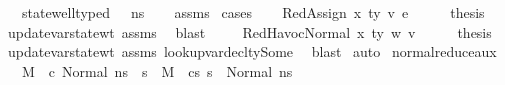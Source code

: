 \begin{isabellebody}
\ \ \ {\isachardoublequoteopen}state{\isacharunderscore}{\kern0pt}well{\isacharunderscore}{\kern0pt}typed\ {\isasymLambda}\ {\isasymOmega}\ ns{\isacharprime}{\kern0pt}{\isachardoublequoteclose}\isanewline
%
\isadelimproof
\ \ %
\endisadelimproof
%
\isatagproof
{}\isamarkupfalse%
\ assms\isanewline
{}\isamarkupfalse%
\ cases\isanewline
\ \ \isamarkupfalse%
\ {\isacharparenleft}{\kern0pt}RedAssign\ x\ ty\ v\ e{\isacharparenright}{\kern0pt}\isanewline
\ \ \isamarkupfalse%
\ \isamarkupfalse%
\ {\isacharquery}{\kern0pt}thesis\ \isamarkupfalse%
\ update{\isacharunderscore}{\kern0pt}var{\isacharunderscore}{\kern0pt}state{\isacharunderscore}{\kern0pt}wt\ assms\ \isamarkupfalse%
\ blast\ \isanewline
{}\isamarkupfalse%
\isanewline
\ \ \isamarkupfalse%
\ {\isacharparenleft}{\kern0pt}RedHavocNormal\ x\ ty\ w\ v{\isacharparenright}{\kern0pt}\isanewline
\ \ \isamarkupfalse%
\ \isamarkupfalse%
\ {\isacharquery}{\kern0pt}thesis\ \isamarkupfalse%
\ update{\isacharunderscore}{\kern0pt}var{\isacharunderscore}{\kern0pt}state{\isacharunderscore}{\kern0pt}wt\ assms\ lookup{\isacharunderscore}{\kern0pt}var{\isacharunderscore}{\kern0pt}decl{\isacharunderscore}{\kern0pt}ty{\isacharunderscore}{\kern0pt}Some\ \isamarkupfalse%
\ blast\isanewline
{}\isamarkupfalse%
\ auto%
\endisatagproof
{\isafoldproof}%
%
\isadelimproof
\isanewline
%
\endisadelimproof
\isanewline
{}\isamarkupfalse%
\ normal{\isacharunderscore}{\kern0pt}reduce{\isacharunderscore}{\kern0pt}aux{\isacharcolon}{\kern0pt}\isanewline
\ \ \ {\isachardoublequoteopen}M{\isacharcomma}{\kern0pt}{\isasymLambda}{\isacharcomma}{\kern0pt}{\isasymGamma}{\isacharcomma}{\kern0pt}{\isasymOmega}\ {\isasymturnstile}\ {\isasymlangle}c{\isacharcomma}{\kern0pt}\ Normal\ ns{\isasymrangle}\ {\isasymrightarrow}\ s{\isacharprime}{\kern0pt}{\isacharprime}{\kern0pt}{\isachardoublequoteclose}\ \ {\isachardoublequoteopen}M{\isacharcomma}{\kern0pt}{\isasymLambda}{\isacharcomma}{\kern0pt}{\isasymGamma}{\isacharcomma}{\kern0pt}{\isasymOmega}\ {\isasymturnstile}\ {\isasymlangle}cs{\isacharcomma}{\kern0pt}\ s{\isacharprime}{\kern0pt}{\isacharprime}{\kern0pt}{\isasymrangle}\ {\isacharbrackleft}{\kern0pt}{\isasymrightarrow}{\isacharbrackright}{\kern0pt}\ Normal\ ns{\isacharprime}{\kern0pt}{\isachardoublequoteclose}\isanewline

\end{isabellebody}

